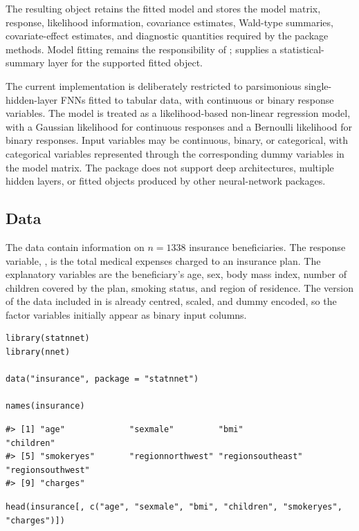 The resulting object retains the fitted  model and stores the model matrix, response, likelihood information, covariance estimates, Wald-type summaries, covariate-effect estimates, and diagnostic quantities required by the package methods.
Model fitting remains the responsibility of ;  supplies a statistical-summary layer for the supported fitted object.

The current implementation is deliberately restricted to parsimonious single-hidden-layer FNNs fitted to tabular data, with continuous or binary response variables.
The model is treated as a likelihood-based non-linear regression model, with a Gaussian likelihood for continuous responses and a Bernoulli likelihood for binary responses.
Input variables may be continuous, binary, or categorical, with categorical variables represented through the corresponding dummy variables in the model matrix.
The package does not support deep architectures, multiple hidden layers, or fitted objects produced by other neural-network packages.

\subsection{Data}\label{data}

The data contain information on \(n = 1338\) insurance beneficiaries.
The response variable, , is the total medical expenses charged to an insurance plan.
The explanatory variables are the beneficiary's age, sex, body mass index, number of children covered by the plan, smoking status, and region of residence.
The version of the data included in  is already centred, scaled, and dummy encoded, so the factor variables initially appear as binary input columns.

\begin{verbatim}
library(statnnet)
library(nnet)

data("insurance", package = "statnnet")

names(insurance)
\end{verbatim}

\begin{verbatim}
#> [1] "age"             "sexmale"         "bmi"             "children"       
#> [5] "smokeryes"       "regionnorthwest" "regionsoutheast" "regionsouthwest"
#> [9] "charges"
\end{verbatim}

\begin{verbatim}
head(insurance[, c("age", "sexmale", "bmi", "children", "smokeryes", "charges")])
\end{verbatim}


